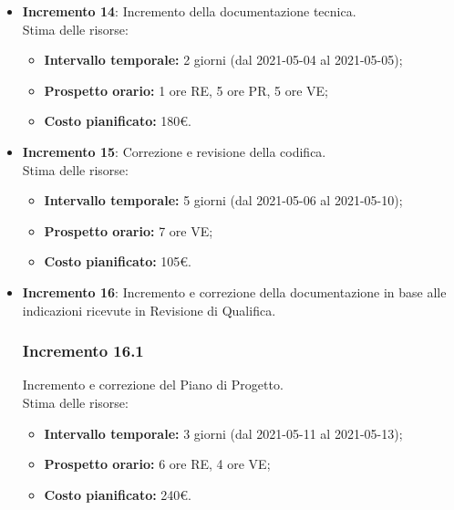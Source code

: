 \begin{itemize}
	\item \textbf{Incremento 14}:
	Incremento della documentazione tecnica.\\
	Stima delle risorse:
	\begin{itemize}
		\item \textbf{Intervallo temporale:} 2 giorni (dal 2021-05-04 al 2021-05-05);
		\item \textbf{Prospetto orario:} 1 ore RE, 5 ore PR, 5 ore VE;
		\item \textbf{Costo pianificato:} 180\euro.
	\end{itemize}
\item \textbf{Incremento 15}:
Correzione e revisione della codifica.\\
Stima delle risorse:
\begin{itemize}
	\item \textbf{Intervallo temporale:} 5 giorni (dal 2021-05-06 al 2021-05-10);
	\item \textbf{Prospetto orario:} 7 ore VE;
	\item \textbf{Costo pianificato:} 105\euro.
\end{itemize}

\item \textbf{Incremento 16}:
Incremento e correzione della documentazione in base alle indicazioni ricevute in Revisione di Qualifica.
\subsubsection{Incremento 16.1}
Incremento e correzione del Piano di Progetto.\\
Stima delle risorse:
\begin{itemize}
	\item \textbf{Intervallo temporale:} 3 giorni (dal 2021-05-11 al 2021-05-13);
	\item \textbf{Prospetto orario:} 6 ore RE, 4 ore VE;
	\item \textbf{Costo pianificato:} 240\euro.
\end{itemize}

\end{itemize}
